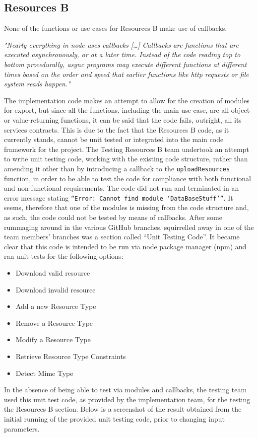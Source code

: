 \documentclass[a4paper]{article}
\begin{document}
\subsection {Resources B}
None of the functions or use cases for Resources B make use of callbacks.

\textit{ "Nearly everything in node uses callbacks […] Callbacks are functions that are executed asynchronously, or at a later time. Instead of the code reading top to bottom procedurally, async programs may execute different functions at different times based on the order and speed that earlier functions like http requests or file system reads happen."}



The implementation code makes an attempt to allow for the creation of modules for export, but since all the functions, including the main use case, are all object or value-returning functions, it can be said that the code fails, outright, all its services contracts. This is due to the fact that the Resources B code, as it currently stands, cannot be unit tested or integrated into the main code framework for the project. 
The Testing Resources B team undertook an attempt to write unit testing code, working with the existing code structure, rather than amending it other than by introducing a callback to the \texttt{uploadResources} function, in order to be able to test the code for compliance with both functional and non-functional requirements. The code did not run and terminated in an error message stating \texttt{“Error: Cannot find module ‘DataBaseStuff’”}. It seems, therefore that one of the modules is missing from the code structure and, as such, the code could not be tested by means of callbacks.
After some rummaging around in the various GitHub branches, squirrelled away in one of the team members’ branches was a section called “Unit Testing Code”. It became clear that this code is intended to be run via node package manager (npm) and ran unit tests for the following options: 
\begin{itemize}
\item	Download valid resource
\item	Download invalid resource
\item	Add a new Resource Type
\item	Remove a Resource Type
\item	Modify a Resource Type
\item	Retrieve Resource Type Constraints
\item	Detect Mime Type
\end{itemize}
In the absence of being able to test via modules and callbacks, the testing team used this unit test code, as provided by the implementation team, for the testing the Resources B section. Below is a screenshot of the result obtained from the initial running of the provided unit testing code, prior to changing input parameters.
\end{document}
